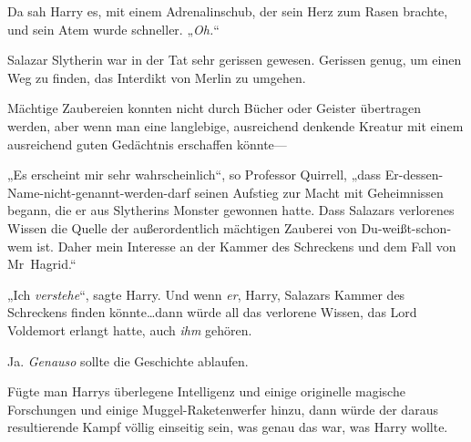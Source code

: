 Da sah Harry es, mit einem Adrenalinschub, der sein Herz zum Rasen brachte, und sein Atem wurde schneller. „\emph{Oh.}“

Salazar Slytherin war in der Tat sehr gerissen gewesen. Gerissen genug, um einen Weg zu finden, das Interdikt von Merlin zu umgehen.

Mächtige Zaubereien konnten nicht durch Bücher oder Geister übertragen werden, aber wenn man eine langlebige, ausreichend denkende Kreatur mit einem ausreichend guten Gedächtnis erschaffen könnte—

„Es erscheint mir sehr wahrscheinlich“, so Professor Quirrell, „dass Er-dessen-Name-nicht-genannt-werden-darf seinen Aufstieg zur Macht mit Geheimnissen begann, die er aus Slytherins Monster gewonnen hatte. Dass Salazars verlorenes Wissen die Quelle der außerordentlich mächtigen Zauberei von Du-weißt-schon-wem ist. Daher mein Interesse an der Kammer des Schreckens und dem Fall von Mr~Hagrid.“

„Ich \emph{verstehe}“, sagte Harry. Und wenn \emph{er}, Harry, Salazars Kammer des Schreckens finden könnte…dann würde all das verlorene Wissen, das Lord Voldemort erlangt hatte, auch \emph{ihm} gehören.

Ja. \emph{Genauso} sollte die Geschichte ablaufen.

Fügte man Harrys überlegene Intelligenz und einige originelle magische Forschungen und einige Muggel-Raketenwerfer hinzu, dann würde der daraus resultierende Kampf völlig einseitig sein, was genau das war, was Harry wollte.

